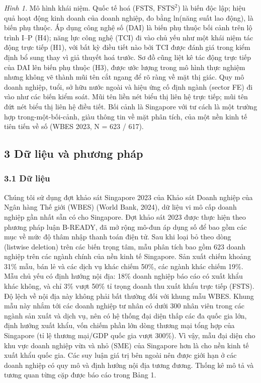 \documentclass[12pt,a4paper]{article}
\begin{document}
\emph{Hình 1.} Mô hình khái niệm. Quốc tế hoá (FSTS,
\(\mathrm{FSTS}^2\)) là biến độc lập; hiệu quả hoạt động kinh doanh của
doanh nghiệp, đo bằng ln(năng suất lao động), là biến phụ thuộc. Áp dụng
công nghệ số (DAI) là biến phụ thuộc bối cảnh trên lộ trình I--P (H4);
năng lực công nghệ (TCI) đi vào chủ yếu như một khái niệm tác động trực
tiếp (H1), với bất kỳ điều tiết nào bởi TCI được đánh giá trong kiểm
định bổ sung thay vì giả thuyết hoá trước. Sơ đồ cũng liệt kê tác động
trực tiếp của DAI lên biến phụ thuộc (H3), được ước lượng trong mô hình
thực nghiệm nhưng không vẽ thành mũi tên cắt ngang để rõ ràng về mặt thị
giác. Quy mô doanh nghiệp, tuổi, sở hữu nước ngoài và hiệu ứng cố định
ngành (sector FE) đi vào như các biến kiểm soát. Mũi tên liền nét biểu
thị liên hệ trực tiếp; mũi tên đứt nét biểu thị liên hệ điều tiết. Bối
cảnh là Singapore với tư cách là một trường hợp trong-một-bối-cảnh, giàu
thông tin về mặt phân tích, của một nền kinh tế tiên tiến về số (WBES
2023, N = 623 / 617).

\hypertarget{3-dux1eef-liux1ec7u-vuxe0-phux1b0ux1a1ng-phuxe1p}{%
\subsection{3 Dữ liệu và phương
pháp}\label{3-dux1eef-liux1ec7u-vuxe0-phux1b0ux1a1ng-phuxe1p}}

\hypertarget{31-dux1eef-liux1ec7u}{%
\subsubsection{3.1 Dữ liệu}\label{31-dux1eef-liux1ec7u}}

Chúng tôi sử dụng đợt khảo sát Singapore 2023 của Khảo sát Doanh nghiệp
của Ngân hàng Thế giới (WBES) (World Bank, 2024), dữ liệu vi mô cấp
doanh nghiệp gần nhất sẵn có cho Singapore. Đợt khảo sát 2023 được thực
hiện theo phương pháp luận B-READY, đã mở rộng mô-đun áp dụng số để bao
gồm các mục về mức độ thâm nhập thanh toán điện tử. Sau khi loại bỏ theo
dòng (listwise deletion) trên các biến trọng tâm, mẫu phân tích bao gồm
623 doanh nghiệp trên các ngành chính của nền kinh tế Singapore. Sản
xuất chiếm khoảng 31\% mẫu, bán lẻ và các dịch vụ khác chiếm 50\%, các
ngành khác chiếm 19\%. Mẫu chủ yếu có định hướng nội địa: 18\% doanh
nghiệp báo cáo có xuất khẩu khác không, và chỉ 3\% vượt 50\% tỉ trọng
doanh thu xuất khẩu trực tiếp (FSTS). Độ lệch về nội địa này không phải
bất thường đối với khung mẫu WBES. Khung mẫu này nhắm tới các doanh
nghiệp tư nhân có dưới 300 nhân viên trong các ngành sản xuất và dịch
vụ, nên có hệ thống đại diện thấp các đa quốc gia lớn, định hướng xuất
khẩu, vốn chiếm phần lớn dòng thương mại tổng hợp của Singapore (tỉ lệ
thương mại/GDP quốc gia vượt 300\%). Vì vậy, mẫu đại diện cho khu vực
doanh nghiệp vừa và nhỏ (SME) của Singapore hơn là cho nền kinh tế xuất
khẩu quốc gia. Các suy luận giá trị bên ngoài nên được giới hạn ở các
doanh nghiệp có quy mô và định hướng nội địa tương đương. Thống kê mô tả
và tương quan từng cặp được báo cáo trong Bảng 1.
\end{document}
